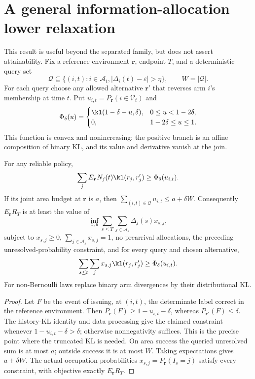 \section{A general information-allocation lower relaxation}
\label{app:information}

This result is useful beyond the separated family, but does not assert
attainability. Fix a reference environment $\boldsymbol r$, endpoint $T$, and a
deterministic query set
\[
 \mathcal Q\subseteq\{(i,t):i\in \mathcal{A}_t,
                  |\Delta_i(t)-\varepsilon|>\eta\},\qquad W=|\mathcal Q|.
\]
For each query choose any allowed alternative $\boldsymbol r'$ that reverses arm
$i$'s membership at time $t$. Put $u_{i,t}=P_{\boldsymbol r}(i\in \mathcal V_t)$ and
\[
 \Phi_\delta(u)=
 \begin{cases}
 \kl(1-\delta-u,\delta),&0\le u<1-2\delta,\\
 0,&1-2\delta\le u\le1.
 \end{cases}
\]
This function is convex and nonincreasing: the positive branch is an affine
composition of binary KL, and its value and derivative vanish at the join.

\begin{proposition}
\label{prop:information}
For any reliable policy,
\[
 \sum_jE_{\boldsymbol r} N_j(t)\kl(r_j,r_j')
                       \ge\Phi_\delta(u_{i,t}).
\]
If its joint area budget at $\boldsymbol r$ is $a$, then
$\sum_{(i,t)\in\mathcal Q}u_{i,t}\le a+\delta W$. Consequently $E_{\boldsymbol r} R_T$
is at least the value of
\[
 \inf_{x,u}\sum_{s\le T}\sum_{j\in \mathcal{A}_s}\Delta_j(s)x_{s,j},
\]
subject to $x_{s,j}\ge0$, $\sum_{j\in \mathcal{A}_s}x_{s,j}=1$, no prearrival
allocations, the preceding unresolved-probability constraint, and for every
query and chosen alternative,
\[
 \sum_{s\le t}\sum_jx_{s,j}\kl(r_j,r_j')
                             \ge\Phi_\delta(u_{i,t}).
\]
For non-Bernoulli laws replace binary arm divergences by their distributional KL.
\end{proposition}
\begin{proof}
Let $F$ be the event of issuing, at $(i,t)$, the determinate label correct in
the reference environment. Then $P_{\boldsymbol r}(F)\ge1-u_{i,t}-\delta$, whereas
$P_{\boldsymbol r'}(F)\le\delta$. The history-KL identity and data processing give
the claimed constraint whenever $1-u_{i,t}-\delta>\delta$; otherwise
nonnegativity suffices. This is the precise point where the truncated KL is
needed. On area success the queried unresolved sum is at most $a$; outside
success it is at most $W$. Taking expectations gives $a+\delta W$.
The actual occupation probabilities $x_{s,j}=P_{\boldsymbol r}(I_s=j)$ satisfy every
constraint, with objective exactly $E_{\boldsymbol r} R_T$.
\end{proof}

